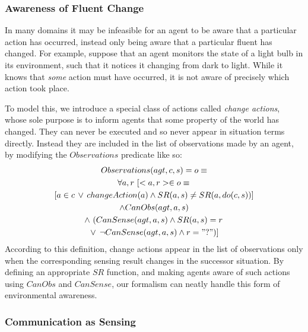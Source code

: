 \documentclass[letterpaper]{article}
\begin{document}
\subsubsection{Awareness of Fluent Change}

In many domains it may be infeasible for an agent to be aware that
a particular action has occurred, instead only being aware that a
particular fluent has changed. For example, suppose that an agent
monitors the state of a light bulb in its environment, such that it
notices it changing from dark to light. While it knows that \emph{some}
action must have occurred, it is not aware of precisely which action
took place.

To model this, we introduce a special class of actions called \emph{change
actions}, whose sole purpose is to inform agents that some property
of the world has changed. They can never be executed and so never
appear in situation terms directly. Instead they are included in the
list of observations made by an agent, by modifying the $Observations$
predicate like so:\begin{multline}
Observations(agt,c,s)=o\equiv\\
\forall a,r\,\left[<a,r>\in o\equiv\right.\\
\left[a\in c\,\vee\, changeAction(a)\wedge SR(a,s)\neq SR(a,do(c,s))\right]\\
\wedge CanObs(agt,a,s)\\
\wedge\,\left(CanSense(agt,a,s)\wedge SR(a,s)=r\right.\\
\left.\vee\,\left.\neg CanSense(agt,a,s)\wedge r="?"\right)\right]\end{multline}
According to this definition, change actions appear in the list of
observations only when the corresponding sensing result changes in
the successor situation. By defining an appropriate $SR$ function,
and making agents aware of such actions using $CanObs$ and $CanSense$,
our formalism can neatly handle this form of environmental awareness.


\subsubsection{Communication as Sensing}
\end{document}
